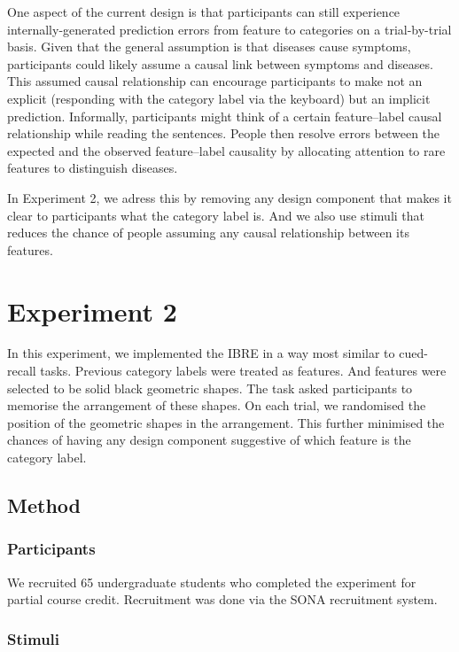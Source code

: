 \documentclass[10pt,letterpaper]{article}
\begin{document}
One aspect of the current design is that participants can still experience internally-generated prediction errors from feature to categories on a trial-by-trial basis.
Given that the general assumption is that diseases cause symptoms, participants could likely assume a causal link between symptoms and diseases.
This assumed causal relationship can encourage participants to make not an explicit (responding with the category label via the keyboard) but an implicit prediction.
Informally, participants might think of a certain feature--label causal relationship while reading the sentences.
People then resolve errors between the expected and the observed feature--label causality by allocating attention to rare features to distinguish diseases.

In Experiment 2, we adress this by removing any design component that makes it clear to participants what the category label is.
And we also use stimuli that reduces the chance of people assuming any causal relationship between its features.

\section{Experiment 2}

In this experiment, we implemented the IBRE in a way most similar to cued-recall tasks.
Previous category labels were treated as features.
And features were selected to be solid black geometric shapes.
The task asked participants to memorise the arrangement of these shapes.
On each trial, we randomised the position of the geometric shapes in the arrangement.
This further minimised the chances of having any design component suggestive of which feature is the category label.

\subsection{Method}

\subsubsection{Participants}

We recruited 65 undergraduate students who completed the experiment for partial course credit.
Recruitment was done via the SONA recruitment system. \\

\subsubsection{Stimuli}
\end{document}
